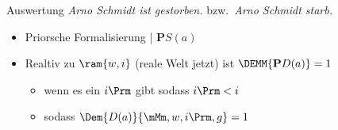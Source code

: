 \begin{frame}
  {Auswertung}
  \onslide<+->
  \onslide<+->
  \textit{Arno Schmidt ist gestorben.} bzw.\ \alert{\textit{Arno Schmidt starb.}}\\
  \Zeile
  \begin{itemize}[<+->]
    \item Priorsche Formalisierung | $\mathbf{P}S(a)$
      \Halbzeile
    \item Realtiv zu $\ram{w,i}$ (reale Welt jetzt) ist \alert{$\DEMM{\mathbf{P}D(a)}=1$}
      \Halbzeile
      \begin{itemize}[<+->]
         \item wenn es ein $i\Prm$ gibt sodass $i\Prm<i$\\
           \Viertelzeile
         \item sodass $\Dem{D(a)}{\mMm,w,i\Prm,g}=1$
           \end{itemize}
  \end{itemize}
\end{frame}

